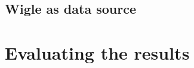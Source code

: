 \documentclass[a4paper,UKenglish]{report}
\begin{document}
%




\subsection{Wigle as data source}
\section{Evaluating the results} 




%



\printbibliography
\end{document}
